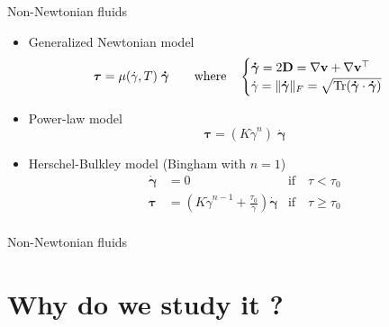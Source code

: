 \documentclass{beamer}  %
\newcommand{\vv}{\mathbf{v}}
\newcommand{\gam}{\boldsymbol{\dot \gamma}}
\begin{document}
\begin{frame}{Non-Newtonian fluids}
    \begin{itemize}
        \item Generalized Newtonian model
        \begin{equation*}
            \boldsymbol{\tau} = \mu(\dot \gamma, T) \;\boldsymbol{\dot \gamma} \qquad \text{where} \quad
            \begin{cases}
                \gam = 2 \mathbf{D} = \nabla \vv + \nabla \vv^\top\\
                \dot \gamma = \|\boldsymbol{\dot \gamma}\|_F = \sqrt{\Tr(\boldsymbol{\dot \gamma} \cdot \boldsymbol{\dot \gamma})}
            \end{cases}
        \end{equation*}
        \item Power-law model
        \begin{equation*}
            \boldsymbol\tau = (K \dot \gamma^n) \; \gam
        \end{equation*}
        \item Herschel-Bulkley model (Bingham with $n=1$)
        \begin{align*}
            \gam &= 0 & \text{if} \quad \tau < \tau_0\\
            \boldsymbol\tau &= \left(K \dot \gamma^{n-1} + \frac{\tau_0}{\dot \gamma}\right) \gam & \text{if} \quad \tau \geq \tau_0\\
        \end{align*}
    \end{itemize}    
\end{frame}

\begin{frame}{Non-Newtonian fluids}
    \begin{figure}
        \centering
        
    \end{figure}
\end{frame}


\section{Why do we study it ?}
\end{document}
